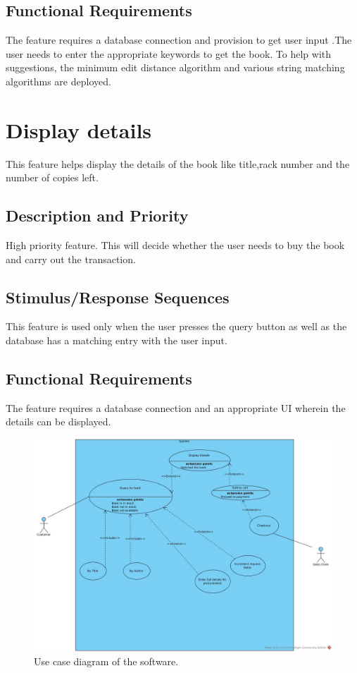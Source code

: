 \documentclass{scrreprt}
\begin{document}
\subsection{Functional Requirements}
The feature requires a database connection and provision to get user input .The user needs to enter the appropriate keywords to get the book. To help with suggestions, the minimum edit distance algorithm and various string matching algorithms are deployed. 



\section{Display details}

This feature helps display the details of the book like title,rack number and the number of copies left. 
\subsection{Description and Priority}
High priority feature. This will decide whether the user needs to buy the book and carry out the transaction. 

\subsection{Stimulus/Response Sequences}
This feature is used only when the user presses the query button as well as the database has a matching entry with the user input.

\subsection{Functional Requirements}
The feature requires a database connection and an appropriate  UI wherein the details can be displayed.

\begin{figure}
  \includegraphics[width=\linewidth]{Customer.jpg}
  \caption{Use case diagram of the software.}
  \label{fig:usecase}
\end{figure}
\end{document}
